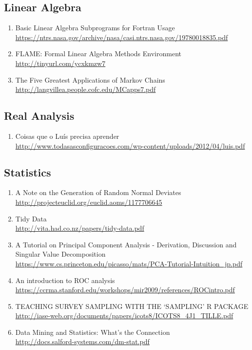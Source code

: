 \documentclass{article}
\begin{document}
\subsection{Linear Algebra}
\begin{enumerate}
	\item {Basic Linear Algebra Subprograms for Fortran Usage\\
\url{https://ntrs.nasa.gov/archive/nasa/casi.ntrs.nasa.gov/19780018835.pdf}}
	\item{FLAME: Formal Linear Algebra Methods Environment\\
\url{http://tinyurl.com/ycxkmzw7}}
	\item{The Five Greatest Applications of Markov Chains\\
\url{http://langvillea.people.cofc.edu/MCapps7.pdf}}
\end{enumerate}
\subsection{Real Analysis}
\begin{enumerate}
	\item {Coisas que o Luís precisa aprender\\
\url{http://www.todasasconfiguracoes.com/wp-content/uploads/2012/04/luis.pdf}}
\end{enumerate}
\subsection {Statistics}
\begin{enumerate}
	\item {A Note on the Generation of Random Normal Deviates\\
\url{http://projecteuclid.org/euclid.aoms/1177706645}}
	\item {Tidy Data\\
\url{http://vita.had.co.nz/papers/tidy-data.pdf}}
	\item {A Tutorial on Principal Component Analysis - Derivation, Discussion and Singular Value Decomposition\\
\url{https://www.cs.princeton.edu/picasso/mats/PCA-Tutorial-Intuition_jp.pdf}}
	\item{An introduction to ROC analysis\\
\url{https://ccrma.stanford.edu/workshops/mir2009/references/ROCintro.pdf}}
	\item{TEACHING SURVEY SAMPLING WITH THE ‘SAMPLING’ R PACKAGE
	\url{http://iase-web.org/documents/papers/icots8/ICOTS8_4J1_TILLE.pdf}}
	\item{Data Mining and Statistics: What's the Connection\\ \url{http://docs.salford-systems.com/dm-stat.pdf}}
\end{enumerate}
\end{document}
